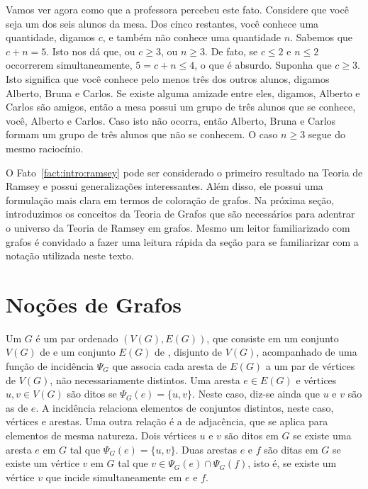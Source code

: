 Vamos ver agora como que a professora percebeu este fato. Considere que você seja um dos seis alunos da mesa. Dos cinco restantes, você conhece uma quantidade, digamos $c$, e também não conhece uma quantidade $n$. Sabemos que $c + n = 5$. Isto nos dá que, ou $c \geq 3$, ou $n \geq 3$. De fato, se $c \leq 2$ e $n \leq 2$ occorrerem simultaneamente, $5 = c + n \leq 4$, o que é absurdo. Suponha que $c \geq 3$. Isto significa que você conhece pelo menos três dos outros alunos, digamos Alberto, Bruna e Carlos. Se existe alguma amizade entre eles, digamos, Alberto e Carlos são amigos, então a mesa possui um grupo de três alunos que se conhece, você, Alberto e Carlos. Caso isto não ocorra, então Alberto, Bruna e Carlos formam um grupo de três alunos que não se conhecem. O caso $n \geq 3$ segue do mesmo raciocínio.

O Fato~\ref{fact:intro:ramsey} pode ser considerado o primeiro resultado na Teoria de Ramsey e possui generalizações interessantes. Além disso, ele possui uma formulação mais clara em termos de coloração de grafos. Na próxima seção, introduzimos os conceitos da Teoria de Grafos que são necessários para adentrar o universo da Teoria de Ramsey em grafos. Mesmo um leitor familiarizado com grafos é convidado a fazer uma leitura rápida da seção para se familiarizar com a notação utilizada neste texto.


\section{Noções de Grafos}

Um  $G$ é um par ordenado $(V(G), E(G))$, que consiste em um conjunto $V(G)$ de  e um conjunto $E(G)$ de , disjunto de $V(G)$, acompanhado de uma função de incidência $\Psi_G$ que associa cada aresta de $E(G)$ a um par de vértices de $V(G)$, não necessariamente distintos.
Uma aresta $e \in E(G)$ e vértices $u, v \in V(G)$ são ditos  se $\Psi_G(e) = \{u,v\}$. Neste caso, diz-se ainda que $u$ e $v$ são as  de $e$. A incidência relaciona elementos de conjuntos distintos, neste caso, vértices e arestas.
Uma outra relação é a de adjacência, que se aplica para elementos de mesma natureza. Dois vértices $u$ e $v$ são ditos  em $G$ se existe uma aresta $e$ em $G$ tal que $\Psi_G(e) = \{u,v\}$. Duas arestas $e$ e $f$ são ditas  em $G$ se existe um vértice $v$ em $G$ tal que $v \in \Psi_G(e) \cap \Psi_G(f)$, isto é, se existe um vértice $v$ que incide simultaneamente em $e$ e $f$.

